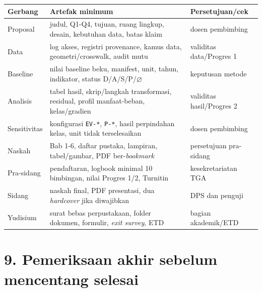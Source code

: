 \documentclass[
  indonesian,
  11pt,
]{article}
\newcounter{none} %
\begin{document}
{\def\LTcaptype{none} %
\begin{longtable}[]{@{}
  >{\raggedright\arraybackslash}p{}
  >{\raggedright\arraybackslash}p{}
  >{\raggedright\arraybackslash}p{}@{}}
\toprule\noalign{}
\begin{minipage}[b]{\linewidth}\raggedright
Gerbang
\end{minipage} & \begin{minipage}[b]{\linewidth}\raggedright
Artefak minimum
\end{minipage} & \begin{minipage}[b]{\linewidth}\raggedright
Persetujuan/cek
\end{minipage} \\
\midrule\noalign{}
\endhead
\bottomrule\noalign{}
\endlastfoot
Proposal & judul, Q1-Q4, tujuan, ruang lingkup, desain, kebutuhan data,
batas klaim & dosen pembimbing \\
Data & log akses, registri provenance, kamus data, geometri/crosswalk,
audit mutu & validitas data/Progres 1 \\
Baseline & nilai baseline beku, manifest, unit, tahun, indikator, status
D/A/S/P/\(\varnothing\) & keputusan metode \\
Analisis & tabel hasil, skrip/langkah transformasi, residual, profil
manfaat-beban, kelas/gradien & validitas hasil/Progres 2 \\
Sensitivitas & konfigurasi \texttt{EV-*}, \texttt{P-*}, hasil
perpindahan kelas, unit tidak terselesaikan & dosen pembimbing \\
Naskah & Bab 1-6, daftar pustaka, lampiran, tabel/gambar, PDF
ber-\emph{bookmark} & persetujuan pra-sidang \\
Pra-sidang & pendaftaran, logbook minimal 10 bimbingan, nilai Progres
1/2, Turnitin & kesekretariatan TGA \\
Sidang & naskah final, PDF presentasi, dua \emph{hardcover} jika
diwajibkan & DPS dan penguji \\
Yudisium & surat bebas perpustakaan, folder dokumen, formulir,
\emph{exit survey}, ETD & bagian akademik/ETD \\
\end{longtable}
}

\section{9. Pemeriksaan akhir sebelum mencentang
selesai}\label{pemeriksaan-akhir-sebelum-mencentang-selesai}
\end{document}
